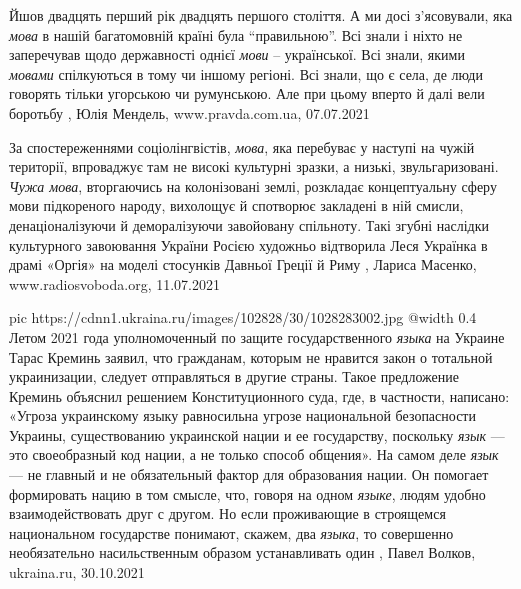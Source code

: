 Йшов двадцять перший рік двадцять першого століття. А ми досі з’ясовували, яка
\emph{мова} в нашій багатомовній країні була \enquote{правильною}. Всі знали і
ніхто не заперечував щодо державності однієї \emph{мови} – української.
Всі знали, якими \emph{мовами} спілкуються в тому чи іншому регіоні. Всі знали,
що є села, де люди говорять тільки угорською чи румунською. Але при цьому
вперто й далі вели боротьбу
, 
Юлія Мендель, www.pravda.com.ua, 07.07.2021

За спостереженнями соціолінгвістів, \emph{мова}, яка перебуває у наступі на чужій
території, впроваджує там не високі культурні зразки, а низькі,
звульгаризовані. \emph{Чужа мова}, вторгаючись на колонізовані землі, розкладає
концептуальну сферу мови підкореного народу, вихолощує й спотворює закладені в
ній смисли, денаціоналізуючи й деморалізуючи завойовану спільноту.
Такі згубні наслідки культурного завоювання України Росією художньо відтворила
Леся Українка в драмі «Оргія» на моделі стосунків Давньої Греції й Риму
, 
Лариса Масенко, www.radiosvoboda.org, 11.07.2021

\ifcmt
  pic https://cdnn1.ukraina.ru/images/102828/30/1028283002.jpg
  @width 0.4
\fi
Летом 2021 года уполномоченный по защите государственного \emph{языка} на
Украине Тарас Креминь заявил, что гражданам, которым не нравится закон о
тотальной украинизации, следует отправляться в другие страны.  Такое
предложение Креминь объяснил решением Конституционного суда, где, в частности,
написано: «Угроза украинскому языку равносильна угрозе национальной
безопасности Украины, существованию украинской нации и ее государству,
поскольку \emph{язык} — это своеобразный код нации, а не только способ общения».  На
самом деле \emph{язык} — не главный и не обязательный фактор для образования нации. Он
помогает формировать нацию в том смысле, что, говоря на одном \emph{языке}, людям
удобно взаимодействовать друг с другом. Но если проживающие в строящемся
национальном государстве понимают, скажем, два \emph{языка}, то совершенно
необязательно насильственным образом устанавливать один
, 
Павел Волков, ukraina.ru, 30.10.2021
